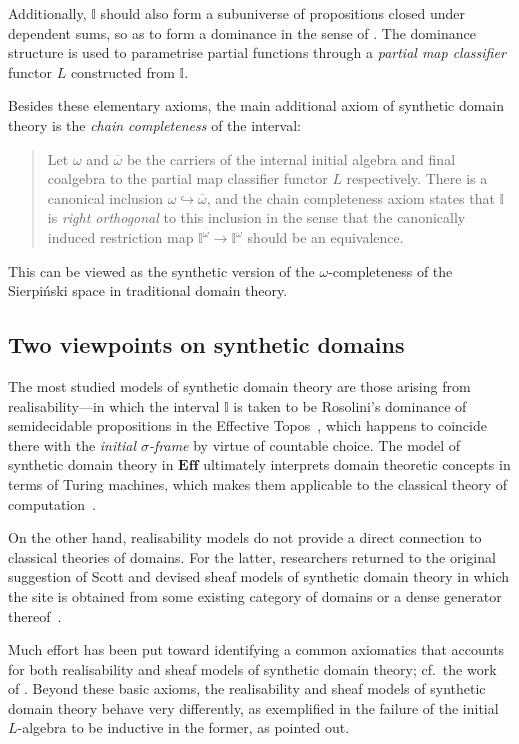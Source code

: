 \documentclass[a4paper,12pt]{amsart}
\theoremstyle{definition}
\newcommand{\mbb}[1]{\mathbb{#1}}
\newcommand{\I}{\mbb I}
\newcommand{\ov}[1]{\overline{#1}}
\newcommand{\hook}{\hookrightarrow}
\begin{document}
Additionally, $\I$ should also form a subuniverse of propositions closed under dependent sums, so as to form a dominance in the sense of \citet{rosolini1986continuity}. The dominance structure is used to parametrise partial functions through a \emph{partial map classifier} functor $L$ constructed from $\I$. 

Besides these elementary axioms, the main additional axiom of synthetic domain theory is the \emph{chain completeness} of the interval: 
\begin{quote}
  Let $\omega$ and $\ov\omega$ be the carriers of the internal initial algebra and final coalgebra to the partial map classifier functor $L$ respectively. There is a canonical inclusion $\omega \hook \ov\omega$, and the chain completeness axiom states that $\I$ is \emph{right orthogonal} to this inclusion in the sense that the canonically induced restriction map $\I^{\ov\omega} \to \I^{\omega}$ should be an equivalence. 
\end{quote} 
This can be viewed as the synthetic version of the $\omega$-completeness of the Sierpi\'nski space in traditional domain theory.

\subsection{Two viewpoints on synthetic domains}

The most studied models of synthetic domain theory are those arising from realisability---in which the interval $\I$ is taken to be Rosolini's dominance of semidecidable propositions in the Effective Topos~\citep{hyland1990first,PhoaWesleyKym-Son1991DtiR}, which happens to coincide there with the \emph{initial $\sigma$-frame} by virtue of countable choice. The model of synthetic domain theory in $\mathbf{Eff}$ ultimately interprets domain theoretic concepts in terms of Turing machines, which makes them applicable to the classical theory of computation~\citep{RN552}. 

On the other hand, realisability models do not provide a direct connection to classical theories of domains. For the latter, researchers returned to the original suggestion of Scott and devised sheaf models of synthetic domain theory in which the site is obtained from some existing category of domains or a dense generator thereof~\cite{fiore-plotkin:1996,FIORE1997151,fiore2001domains}.

Much effort has been put toward identifying a common axiomatics that accounts for both realisability and sheaf models of synthetic domain theory; cf.\ the work of \citet{reus-streicher:1999,simpson:2004}. Beyond these basic axioms, the realisability and sheaf models of synthetic domain theory behave very differently, as exemplified in the failure of the initial $L$-algebra to be inductive in the former, as \citet{VANOOSTEN2000233} pointed out.
\end{document}
